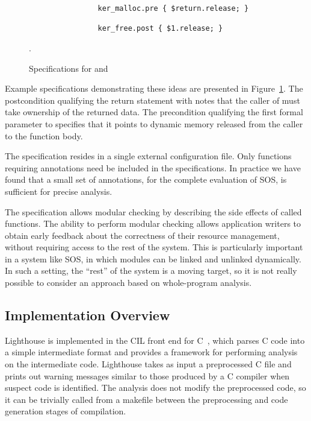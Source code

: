 \begin{figure}[tp]
\centering
\lstset{numbers=none, language=C}
\begin{lstlisting}
                ker_malloc.pre { $return.release; }

                ker_free.post { $1.release; }
\end{lstlisting}
\caption{\label{fig:spec}Specifications for  and
}.
\end{figure}



Example specifications demonstrating these ideas are presented in
Figure~\ref{fig:spec}.
%
The postcondition qualifying the return statement with  notes
that the caller of  must take ownership of the returned
data.
%
The precondition qualifying the first formal parameter to 
specifies that it points to dynamic memory released from the caller to the function body.



The specification resides in a single external configuration file.
%
Only functions requiring annotations need be included in the specifications.
%
In practice we have found that a small set of annotations, \numannote for
the complete evaluation of SOS, is sufficient for precise analysis. 



The specification allows modular checking by describing the side effects of
called functions.
%
The ability to perform modular checking allows application writers to obtain
early feedback about the correctness of their resource management, without
requiring access to the rest of the system.  
%
This is particularly important in a system like SOS, in which modules can be
linked and unlinked dynamically.  
%
In such a setting, the ``rest'' of the system is a moving target, so it is not
really possible to consider an approach based on whole-program analysis.



\subsection{Implementation Overview}



Lighthouse is implemented in the CIL front end for C~\cite{CIL}, which
parses C code into a simple intermediate format and provides a framework for
performing analysis on the intermediate code. 
%
Lighthouse takes as input a preprocessed C file and prints out warning
messages similar to those produced by a C compiler when suspect code is
identified.
%
The analysis does not modify the preprocessed code, so it can be trivially
called from a makefile between the preprocessing and code generation stages
of compilation.



